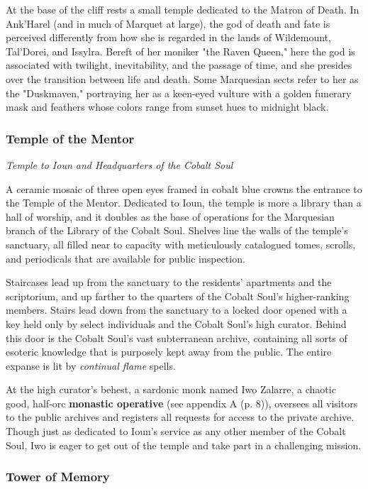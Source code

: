 \documentclass[a4paper, 11pt, bg=full, twocolumn, nooutline]{dndbook}
\begin{document}
At the base of the cliff rests a small temple dedicated to the Matron of Death. In Ank'Harel (and in much of Marquet at large), the god of death and fate is perceived differently from how she is regarded in the lands of Wildemount, Tal'Dorei, and Issylra. Bereft of her moniker "the Raven Queen," here the god is associated with twilight, inevitability, and the passage of time, and she presides over the transition between life and death. Some Marquesian sects refer to her as the "Duskmaven," portraying her as a keen-eyed vulture with a golden funerary mask and feathers whose colors range from sunset hues to midnight black.

\subsubsection{Temple of the Mentor}

\textit{Temple to Ioun and Headquarters of the Cobalt Soul}

A ceramic mosaic of three open eyes framed in cobalt blue crowns the entrance to the Temple of the Mentor. Dedicated to Ioun, the temple is more a library than a hall of worship, and it doubles as the base of operations for the Marquesian branch of the Library of the Cobalt Soul. Shelves line the walls of the temple's sanctuary, all filled near to capacity with meticulously catalogued tomes, scrolls, and periodicals that are available for public inspection.

Staircases lead up from the sanctuary to the residents' apartments and the scriptorium, and up farther to the quarters of the Cobalt Soul's higher-ranking members. Stairs lead down from the sanctuary to a locked door opened with a key held only by select individuals and the Cobalt Soul's high curator. Behind this door is the Cobalt Soul's vast subterranean archive, containing all sorts of esoteric knowledge that is purposely kept away from the public. The entire expanse is lit by \textit{continual flame} spells.

At the high curator's behest, a sardonic monk named Iwo Zalarre, a chaotic good, half-orc \textbf{monastic operative} (see appendix A (p. 8)), oversees all visitors to the public archives and registers all requests for access to the private archive. Though just as dedicated to Ioun's service as any other member of the Cobalt Soul, Iwo is eager to get out of the temple and take part in a challenging mission.

\subsubsection{Tower of Memory}
\end{document}

